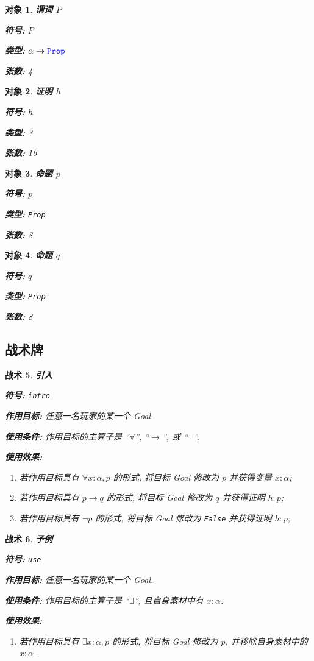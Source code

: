 \documentclass[UTF8]{ctexart}
\DeclareMathOperator{\0}{\mathbf{0}}                    %
\newcommand{\<}{\langle}
\renewcommand{\>}{\rangle}                              %
\newenvironment{dfn_box}{
    \begin{tcolorbox}[enhanced, colback=dfn_green2, boxrule=0pt, frame hidden,
        borderline west={0.7mm}{0.1mm}{dfn_green1},breakable]
    }
    {\end{tcolorbox}}
\newenvironment{thm_box}{
    \begin{tcolorbox}[enhanced, colback=thm_blue2, boxrule=0pt, frame hidden,
        borderline west={0.7mm}{0.1mm}{thm_blue1},breakable]
    }
    {\end{tcolorbox}}
\theoremstyle{MyStyle} %
\newtheorem{definition}{对象}[subsection]
\newenvironment{obj}[4]
{
    \begin{dfn_box}
        \begin{definition}
            \textbf{#1}

            \textbf{符号: }#2
                
            \textbf{类型: }#3

            \textbf{张数: }#4
}
{
        \end{definition}
    \end{dfn_box}
}
\newtheorem{mytactic}[definition]{战术}
\newenvironment{tactic}[4]
{
    \begin{thm_box}
        \begin{mytactic}
            \textbf{#1}

            \textbf{符号: }#2

            \textbf{作用目标: }#3

            \textbf{使用条件: }#4

            \textbf{使用效果: }
}
{
        \end{mytactic}
    \end{thm_box}
}
\newcommand*{\lean}[1]{\texttt{\color{blue}#1}}
\begin{document}
        \begin{obj}
            {谓词 $P$}
            {$P$}
            {$\alpha \to \lean{Prop}$}
            {4}
        \end{obj}

        \begin{obj}
            {证明 $h$}
            {$h$}
            {?}
            {16}
        \end{obj}

        \begin{obj}
            {命题 $p$}
            {$p$}
            {\lean{Prop}}
            {8}
        \end{obj}

        \begin{obj}
            {命题 $q$}
            {$q$}
            {\lean{Prop}}
            {8}
        \end{obj}

    \subsection{战术牌}
        
        \begin{tactic}
            {引入}
            {\lean{intro}}
            {任意一名玩家的某一个 Goal. }
            {作用目标的主算子是 ``$\forall$'',  ``$\to$'', 或 ``$\neg$''. }
            \begin{enumerate}
                \item 若作用目标具有 $\forall x : \alpha, p$ 的形式, 将目标 Goal 修改为 $p$ 并获得变量 $x : \alpha$; 
                \item 若作用目标具有 $p \to q$ 的形式, 将目标 Goal 修改为 $q$ 并获得证明 $h : p$; 
                \item 若作用目标具有 $\neg p$ 的形式, 将目标 Goal 修改为 \lean{False} 并获得证明 $h : p$; 
            \end{enumerate}
        \end{tactic}

        \begin{tactic}
            {予例}
            {\lean{use}}
            {任意一名玩家的某一个 Goal. }
            {作用目标的主算子是 ``$\exists$'', 且自身素材中有 $x : \alpha$. }
            \begin{enumerate}
                \item 若作用目标具有 $\exists x : \alpha, p$ 的形式, 将目标 Goal 修改为 $p$, 并移除自身素材中的 $x : \alpha$. 
            \end{enumerate}
        \end{tactic}
\end{document}
